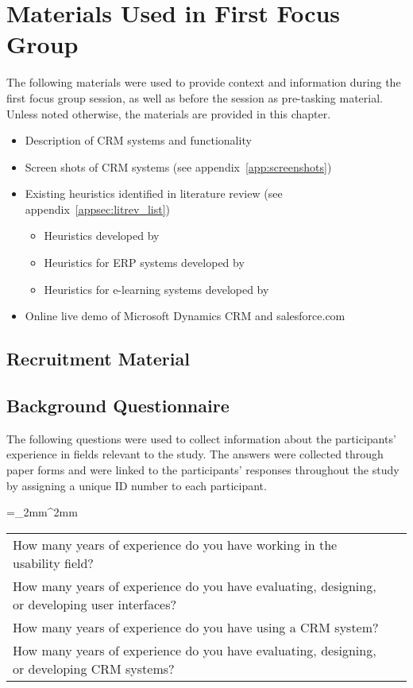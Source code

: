 \chapter{Materials Used in First Focus Group}
\label{app:first_group}
The following materials were used to provide context and information during the first focus group session, as well as before the session as pre-tasking material. Unless noted otherwise, the materials are provided in this chapter.

\begin{itemize}
	\item Description of CRM systems and functionality
	\item Screen shots of CRM systems (see appendix~\ref{app:screenshots})
	\item Existing heuristics identified in literature review (see appendix~\ref{appsec:litrev_list})
		\begin{itemize}
			\item Heuristics developed by \citet{Nielsen1994a}
			\item Heuristics for ERP systems developed by \citet{Singh2009}
			\item Heuristics for e-learning systems developed by \citet{Ardito2006}
		\end{itemize}
	\item Online live demo of Microsoft Dynamics CRM and salesforce.com
\end{itemize}

\section{Recruitment Material}


\section{Background Questionnaire}
The following questions were used to collect information about the participants' experience in fields relevant to the study. The answers were collected through paper forms and were linked to the participants' responses throughout the study by assigning a unique ID number to each participant.

\tabulinesep=_2mm^2mm
\begin{longtabu} to \textwidth {X[1, p] r}		
	How many years of experience do you have working in the usability field? & \underline{\makebox[1in]{}}\\	
	How many years of experience do you have evaluating, designing, or developing user interfaces? & \underline{\makebox[1in]{}}\\
	How many years of experience do you have using a CRM system? & \underline{\makebox[1in]{}}\\	
	How many years of experience do you have evaluating, designing, or developing CRM systems? & \underline{\makebox[1in]{}}
\end{longtabu}

